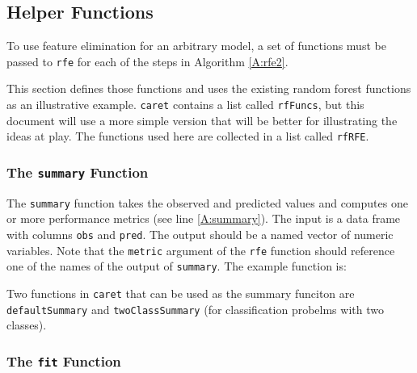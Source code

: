 \documentclass[12pt]{article}
\begin{document}
\subsection{Helper Functions}\label{S:helpers}

To use feature elimination for an arbitrary model, a set of functions
must be passed to \texttt{rfe} for each of the steps in Algorithm
\ref{A:rfe2}. 

This section defines those functions and uses the
existing random forest functions as an illustrative
example. \texttt{caret} contains a list called \texttt{rfFuncs}, but
this document will use a more simple version that will be better for
illustrating the ideas at play. The functions used here are collected
in a list called \texttt{rfRFE}.



\subsubsection{The \texttt{summary} Function}\label{S:summary}

The \texttt{summary} function takes the observed and predicted values
and computes one or more performance metrics (see line
\ref{A:summary}). The input is a data frame with columns \texttt{obs}
and \texttt{pred}. The output should be a named vector of numeric
variables. Note that the \texttt{metric} argument of the \texttt{rfe}
function should reference one of the names of the output of
\texttt{summary}. The example function is:
\begin{Schunk}
\end{Schunk}

Two functions in \texttt{caret} that can be used as the summary
funciton are \texttt{defaultSummary} and \texttt{twoClassSummary} (for
classification probelms with two classes). 


\subsubsection{The \texttt{fit} Function}\label{S:fit}
\end{document}
